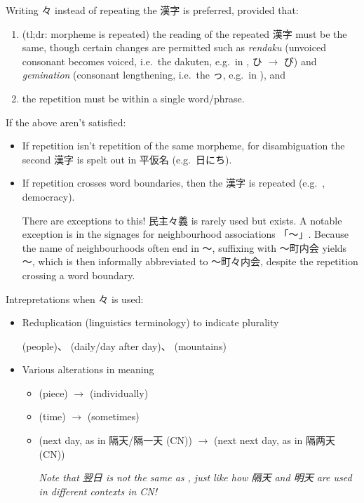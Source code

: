 \documentclass[../nihongo-gakushuu-kyouzai.tex]{subfiles}
\begin{document}
Writing 々 instead of repeating the 漢字 is preferred, provided that:
\begin{enumerate}[label=\arabic*.]
    \item (tl;dr: morpheme is repeated) the reading of the repeated 漢字 must be the same, though certain changes are permitted such as \emph{rendaku} (unvoiced consonant becomes voiced, i.e.\ the dakuten, e.g.\ in , ひ $\to$ び) and \emph{gemination} (consonant lengthening, i.e.\ the っ, e.g.\ in ), and
    \item the repetition must be within a single word/phrase.
\end{enumerate}
If the above aren't satisfied:
\begin{itemize}
    \item If repetition isn't repetition of the same morpheme, for disambiguation the second 漢字 is spelt out in 平仮名 (e.g.\ 日にち).
    \item If repetition crosses word boundaries, then the 漢字 is repeated (e.g.\ , democracy).

    There are exceptions to this! 民主々義 is rarely used but exists. A notable exception is in the signages for neighbourhood associations 「〜」. Because the name of neighbourhoods often end in 〜, suffixing with 〜町内会 yields 〜, which is then informally abbreviated to 〜町々内会, despite the repetition crossing a word boundary.

\end{itemize}

Intrepretations when 々 is used:
\begin{itemize}
    \item Reduplication (linguistics terminology) to indicate plurality

     (people)、 (daily/day after day)、 (mountains)
    \item Various alterations in meaning
    \begin{itemize}
        \item {} (piece) $\to$  (individually)
        \item {} (time) $\to$  (sometimes)
        \item {} (next day, as in 隔天/隔一天 (CN)) $\to$  (next next day, as in 隔两天 (CN))

        \emph{Note that 翌日 is not the same as , just like how 隔天 and 明天 are used in different contexts in CN!}
    \end{itemize}
\end{itemize}
\end{document}
